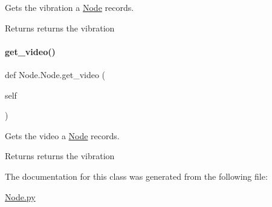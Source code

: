 Gets the vibration a \mbox{\hyperlink{class_node_1_1_node}{Node}} records. 

\begin{DoxyReturn}{Returns}
returns the vibration 
\end{DoxyReturn}
\mbox{\label{class_node_1_1_node_ad7a4d2511f3a7c8462baeceb0cc44a98}} 
\paragraph{\texorpdfstring{get\_video()}{get\_video()}}
{\footnotesize\ttfamily def Node.\+Node.\+get\+\_\+video (\begin{DoxyParamCaption}\item[{}]{self }\end{DoxyParamCaption})}



Gets the video a \mbox{\hyperlink{class_node_1_1_node}{Node}} records. 

\begin{DoxyReturn}{Returns}
returns the vibration 
\end{DoxyReturn}


The documentation for this class was generated from the following file\+:\begin{DoxyCompactItemize}
\item 
\mbox{\hyperlink{_node_8py}{Node.\+py}}\end{DoxyCompactItemize}
